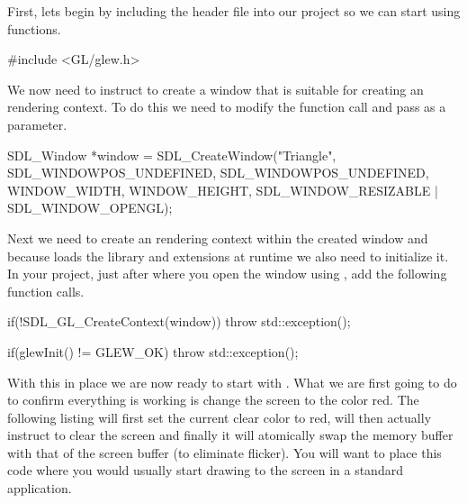 \documentclass[10pt]{article}
\begin{document}
First, lets begin by including the  header file into our
project so we can start using  functions.

\begin{Listing}

  #include <GL/glew.h>

\end{Listing}

We now need to instruct  to create a window that is
suitable for creating an  rendering context. To do this
we need to modify the  function call and pass
 as a parameter.

\begin{Listing}

SDL_Window *window = SDL_CreateWindow("Triangle",
    SDL_WINDOWPOS_UNDEFINED, SDL_WINDOWPOS_UNDEFINED,
    WINDOW_WIDTH, WINDOW_HEIGHT, SDL_WINDOW_RESIZABLE | SDL_WINDOW_OPENGL);

\end{Listing}

Next we need to create an  rendering context within
the created  window and because  loads the
 library and extensions at runtime we also need to initialize
it. In your project, just after where you open the  window
using , add the following function calls.

\begin{Listing}

  if(!SDL_GL_CreateContext(window))
  {
    throw std::exception();
  }

  if(glewInit() != GLEW_OK)
  {
    throw std::exception();
  }

\end{Listing}


With this in place we are now ready to start with . What
we are first going to do to confirm everything is working is change
the screen to the color red. The following listing will first set the
current  clear color to red, will then actually instruct
 to clear the screen and finally it will atomically swap the
 memory buffer with that of the screen buffer (to eliminate
flicker). You will want to place this code where you would usually start
drawing to the screen in a standard  application.
\end{document}
